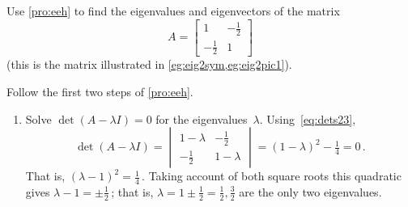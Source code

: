 \begin{example} \label{eg:2evals}
Use \cref{pro:eeh} to find the eigenvalues and eigenvectors of the matrix
\begin{equation*}
A=\begin{bmatrix} 1&-\frac12\\-\frac12&1 \end{bmatrix}
\end{equation*}
(this is the matrix illustrated in \cref{eg:eig2sym,eg:eig2pic1}).
\begin{solution} Follow the first two steps of \cref{pro:eeh}.
\begin{enumerate}
\item Solve \(\det(A-\lambda I)=0\) for the eigenvalues~\(\lambda\).
Using~\eqref{eq:dets23},
\begin{equation*}
\det(A-\lambda I)=\begin{vmatrix} 1-\lambda&-\frac12\\
-\frac12&1-\lambda \end{vmatrix}
=(1-\lambda)^2-\tfrac14=0\,.
\end{equation*}
That is, \((\lambda-1)^2=\frac14\)\,.  Taking account of both square roots this quadratic gives \(\lambda-1=\pm\frac12\)\,; that is, \(\lambda=1\pm\frac12=\frac12,\frac32\) are the only two eigenvalues.


\end{enumerate}
\end{solution}
\end{example}
